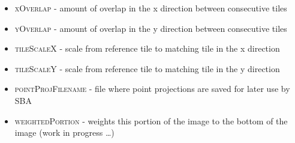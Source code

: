 \documentclass[12pt]{article}
\begin{document}
\begin{itemize}
	\item{\textsc{xOverlap}} - amount of overlap in the x direction between consecutive tiles
	\item{\textsc{yOverlap}} - amount of overlap in the y direction between consecutive tiles
	\item{\textsc{tileScaleX}} - scale from reference tile to matching tile in the x direction
	\item{\textsc{tileScaleY}} - scale from reference tile to matching tile in the y direction
	\item{\textsc{pointProjFilename}} - file where point projections are saved for later use by SBA
	\item{\textsc{weightedPortion}} - weights this portion of the image to the bottom of the image (work in progress \ldots)
\end{itemize}
\end{document}
